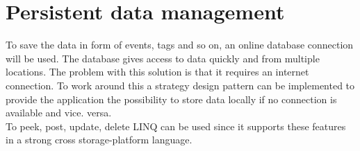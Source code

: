 \section{Persistent data management}
To save the data in form of events, tags and so on, an online database connection will be used. The database gives access to data quickly and from multiple locations. The problem with this solution is that it requires an internet connection. To work around this a strategy design pattern can be implemented to provide the application the possibility to store data locally if no connection is available and vice. versa. \\
To peek, post, update, delete LINQ can be used since it supports these features in a strong cross storage-platform language.